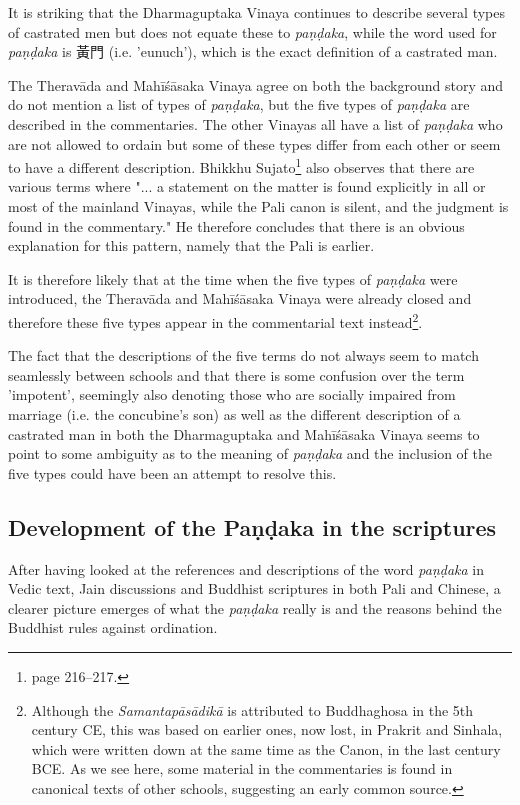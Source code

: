 It is striking that the Dharmaguptaka Vinaya continues to describe several types of castrated men but does not equate these to {\em paṇḍaka}, while the word used for {\em paṇḍaka} is 黃門 (i.e. 'eunuch'), which is the exact definition of a castrated man.

The Theravāda and Mahīśāsaka Vinaya agree on both the background story and do not mention a list of types of {\em paṇḍaka}, but the five types of {\em paṇḍaka} are described in the commentaries. The other Vinayas all have a list of {\em paṇḍaka} who are not allowed to ordain but some of these types differ from each other or seem to have a different description. Bhikkhu Sujato\footnote{\cite{sujato2009} page 216–217.} also observes that there are various terms where "... a statement on the matter is found explicitly in all or most of the mainland Vinayas, while the Pali canon is silent, and the judgment is found in the commentary." He therefore concludes that there is an obvious explanation for this pattern, namely that the Pali is earlier.

It is therefore likely that at the time when the five types of {\em paṇḍaka} were introduced, the Theravāda and Mahīśāsaka Vinaya were already closed and therefore these five types appear in the commentarial text instead\footnote{Although the {\em Samantapāsādikā} is attributed to Buddhaghosa in the 5th century CE, this was based on earlier ones, now lost, in Prakrit and Sinhala, which were written down at the same time as the Canon, in the last century BCE. As we see here, some material in the commentaries is found in canonical texts of other schools, suggesting an early common source.}. 

The fact that the descriptions of the five terms do not always seem to match seamlessly between schools and that there is some confusion over the term 'impotent', seemingly also denoting those who are socially impaired from marriage (i.e. the concubine's son) as well as the different description of a castrated man in both the Dharmaguptaka and Mahīśāsaka Vinaya seems to point to some ambiguity as to the meaning of {\em paṇḍaka} and the inclusion of the five types could have been an attempt to resolve this.


\subsection{Development of the Paṇḍaka in the scriptures}
After having looked at the references and descriptions of the word {\em paṇḍaka} in Vedic text, Jain discussions and Buddhist scriptures in both Pali and Chinese, a clearer picture emerges of what the {\em paṇḍaka} really is and the reasons behind the Buddhist rules against ordination.

